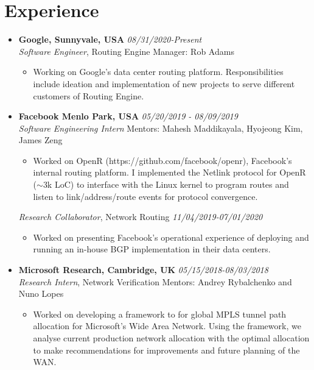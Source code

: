 \documentclass[11pt,a4paper,sans]{moderncv}        %
\begin{document}
\section{Experience}
\begin{itemize}
	\item \textbf{Google, Sunnyvale, USA} \hfill \emph{08/31/2020-Present} \\
	\emph{Software Engineer}, Routing Engine \hfill Manager: Rob Adams
	\begin{itemize}
		\item Working on Google's data center routing platform. Responsibilities include ideation and implementation of new projects to serve different customers of Routing Engine. 
	\end{itemize}
	\vspace*{6pt}

	\item \textbf{Facebook Menlo Park, USA} \hfill \emph{05/20/2019 - 08/09/2019} \\
	\emph{Software Engineering Intern} \hfill Mentors: Mahesh Maddikayala, Hyojeong Kim, James Zeng
	\begin{itemize}
		\item Worked on OpenR (https://github.com/facebook/openr), Facebook's internal routing platform. I implemented the
		Netlink protocol for OpenR ($\sim$3k LoC) to interface with the Linux kernel to program routes and listen to link/address/route events
		for protocol convergence.
	\end{itemize}
	\emph{Research Collaborator}, Network Routing \hfill \emph{11/04/2019-07/01/2020} 
	\begin{itemize}
		\item Worked on presenting Facebook's operational experience of
		deploying and running an in-house BGP implementation in their data centers.
	\end{itemize}
	\vspace*{6pt}

	\item \textbf{Microsoft Research, Cambridge, UK} \hfill \emph{05/15/2018-08/03/2018} \\
	\emph{Research Intern}, Network Verification \hfill Mentors: Andrey Rybalchenko and Nuno Lopes
	\begin{itemize}
		\item Worked on developing a framework to for global MPLS tunnel path allocation for Microsoft's
		Wide Area Network. Using the framework, we analyse current production network allocation with
		the optimal allocation to make recommendations for improvements and future planning of the WAN.
	\end{itemize}
	\vspace*{6pt}


\end{itemize}
\end{document}
